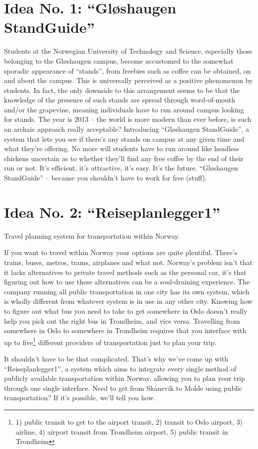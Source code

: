 \section{Idea No. 1: ``Gløshaugen StandGuide''}
	Students at the Norwegian University of Technology and Science, 
	especially those belonging to the Gløshaugen campus, 
	become accustomed to the somewhat sporadic appearance of ``stands'', 
	from freebies such as coffee can be obtained, on and about the campus.
	This is universally perceived as a positive phenomenon by students.
	In fact, the only downside to this arrangement seems to be that the knowledge of the presence of such stands are spread through word-of-mouth and/or the grapevine,
	meaning individuals have to run around campus looking for stands.
	The year is 2013 -- the world is more modern than ever before, 
	is such an archaic approach really acceptable?
	Introducing ``Gløshaugen StandGuide'', a system that lets you see if there's any stands on campus at any given time and what they're offering.
	No more will students have to run around like headless chickens uncertain as to whether they'll find any free coffee by the end of their run or not.
	It's efficient, it's attractive, it's easy.
	It's the future.
	``Gløshaugen StandGuide'' -- because you shouldn't have to work for free (stuff).

\section{Idea No. 2: ``Reiseplanlegger1''}
	Travel planning system for transportation within Norway.

	If you want to travel within Norway your options are quite plentiful.
	There's trains, buses, metros, trams, airplanes and what not.
	Norway's problem isn't that it lacks alternatives to private travel methods such as the personal car, 
	it's that figuring out how to use these alternatives can be a soul-draining experience.
	The company running all public transportation in one city has its own system,
	which is wholly different from whatever system is in use in any other city.
	Knowing how to figure out what bus you need to take to get somewhere in Oslo doesn't really help you pick out the right bus in Trondheim, and vice versa.
	Travelling from somewhere in Oslo to somewhere in Trondheim requires that you interface with up to five\footnote{1) public transit to get to the airport transit, 2) transit to Oslo airport, 3) airline, 4) airport transit from Trondheim airport, 5) public transit in Trondheim} different providers of transportation just to plan your trip.

	It shouldn't have to be that complicated.
	That's why we've come up with ``Reiseplanlegger1'',
	a system which aims to integrate every single method of publicly available transportation within Norway, 
	allowing you to plan your trip through one single interface. 
	Need to get from Skånevik to Molde using public transportation?
	If it's possible, we'll tell you how.